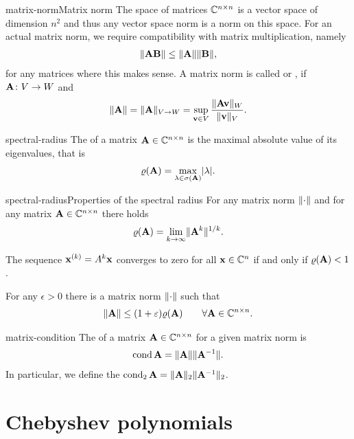 \begin{Definition*}{matrix-norm}{Matrix norm}
  The space of matrices $\mathbb C^{n\times n}$ is a vector space of dimension $n^2$ and thus any vector space norm is a norm on this space. For an actual matrix norm, we require compatibility with matrix multiplication, namely
  \begin{gather}
    \lVert\mathbf A\mathbf B\rVert \le \lVert\mathbf A\rVert\lVert\mathbf B\rVert,
  \end{gather}
  for any matrices where this makes sense. A matrix norm is called  or , if $\mathbf A\colon V\to W$ and
  \begin{gather}
    \lVert\mathbf A\rVert = \lVert\mathbf A\rVert_{V\to W} = \sup_{\mathbf v\in V}\frac{\lVert\mathbf A\mathbf v\rVert_W}{\lVert\mathbf v\rVert_V}.
  \end{gather}
\end{Definition*}

\begin{Definition}{spectral-radius}
  The  of a matrix $\mathbf A\in\mathbb C^{n\times n}$ is the
  maximal absolute value of its eigenvalues, that is
  \begin{gather}
    \varrho(\mathbf A) = \max_{\lambda\in\sigma(\mathbf A)} \lvert\lambda\rvert.
  \end{gather}
\end{Definition}

\begin{Lemma*}{spectral-radius}{Properties of the spectral radius}
  For any matrix norm $\lVert\cdot\rVert$ and for any matrix $\mathbf A\in\mathbb C^{n\times n}$ there holds
  \begin{gather}
    \varrho(\mathbf A) = \lim_{k\to\infty} \lVert\mathbf A^k\rVert^{1/k}.
  \end{gather}

  The sequence $\mathbf x^{(k)} = A^k\mathbf x$ converges to zero for all
  $\mathbf x\in\mathbb C^n$ if and only if $\varrho(\mathbf A)<1$.

  For any $\epsilon>0$
  there is a matrix norm $\lVert\cdot\rVert$ such that
  \begin{gather}
    \lVert\mathbf A\rVert \le (1+\varepsilon) \varrho(\mathbf A) \qquad \forall \mathbf A\in\mathbb C^{n\times n}.
  \end{gather}
\end{Lemma*}

\begin{Definition}{matrix-condition}
  The  of a matrix $\mathbf A\in\mathbb C^{n\times n}$ for a given
  matrix norm is
  \begin{gather*}
    \operatorname{cond}\mathbf A = \lVert\mathbf A\rVert\lVert\mathbf A^{-1}\rVert.
  \end{gather*}
  In particular, we define the 
 $\operatorname{cond}_2\mathbf A = \lVert\mathbf A\rVert_2\lVert\mathbf A^{-1}\rVert_2$.
\end{Definition}

\section{Chebyshev polynomials}




\printindex

